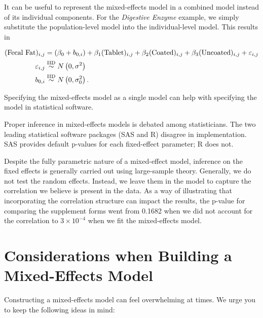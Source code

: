 \documentclass[
]{book}
\theoremstyle{plain}
\theoremstyle{mydefn}
\theoremstyle{myexmpl}
\theoremstyle{remark}
\begin{document}
It can be useful to represent the mixed-effects model in a combined model instead of its individual components. For the \emph{Digestive Enzyme} example, we simply substitute the population-level model into the individual-level model. This results in

\[
\begin{aligned}
  (\text{Fecal Fat})_{i,j} 
    &= \left(\beta_0 + b_{0,i}\right) + \beta_1 (\text{Tablet})_{i,j} + \beta_2 (\text{Coated})_{i,j} + \beta_3 (\text{Uncoated})_{i,j} + \varepsilon_{i,j} \\
  \varepsilon_{i,j} &\stackrel{\text{IID}}{\sim} N\left(0, \sigma^2\right) \\
  b_{0,i} &\stackrel{\text{IID}}{\sim} N\left(0, \sigma^2_0\right).
\end{aligned}
\]

\begin{rmdtip}
Specifying the mixed-effects model as a single model can help with specifying the model in statistical software.
\end{rmdtip}

\begin{rmdwarning}
Proper inference in mixed-effects models is debated among statisticians. The two leading statistical software packages (SAS and R) disagree in implementation. SAS provides default p-values for each fixed-effect parameter; R does not.
\end{rmdwarning}

Despite the fully parametric nature of a mixed-effect model, inference on the fixed effects is generally carried out using large-sample theory. Generally, we do not test the random effects. Instead, we leave them in the model to capture the correlation we believe is present in the data. As a way of illustrating that incorporating the correlation structure can impact the results, the p-value for comparing the supplement forms went from 0.1682 when we did not account for the correlation to \ensuremath{3\times 10^{-4}} when we fit the mixed-effects model.

\hypertarget{considerations-when-building-a-mixed-effects-model}{%
\section{Considerations when Building a Mixed-Effects Model}\label{considerations-when-building-a-mixed-effects-model}}

Constructing a mixed-effects model can feel overwhelming at times. We urge you to keep the following ideas in mind:
\end{document}
